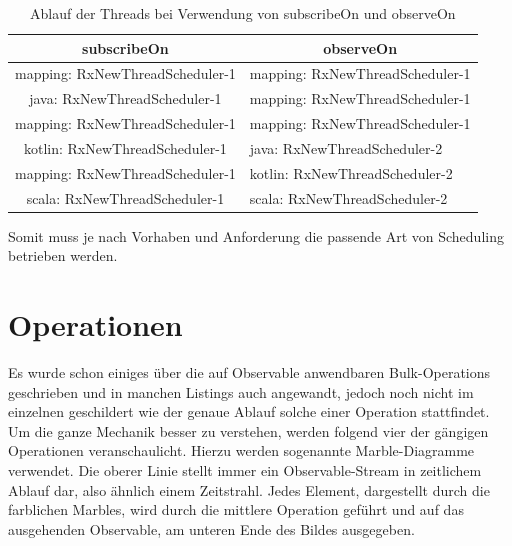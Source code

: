 \begin{table}[]
	\centering
	\begin{tabular}{|c|l|}
		\hline
		\rowcolor[HTML]{C0C0C0} 
		subscribeOn                                           & \multicolumn{1}{c|}{\cellcolor[HTML]{C0C0C0}observeOn} \\ \hline
		mapping: RxNewThreadScheduler-1                       & mapping: RxNewThreadScheduler-1 \\ \hline
		java: RxNewThreadScheduler-1						  & mapping: RxNewThreadScheduler-1 \\ \hline
		mapping: RxNewThreadScheduler-1 					  & mapping: RxNewThreadScheduler-1 \\ \hline
		kotlin: RxNewThreadScheduler-1  					  & java: RxNewThreadScheduler-2    \\ \hline
		mapping: RxNewThreadScheduler-1                       & kotlin: RxNewThreadScheduler-2  \\ \hline
		scala: RxNewThreadScheduler-1                         & scala: RxNewThreadScheduler-2   \\ \hline
	\end{tabular}
	\caption{Ablauf der Threads bei Verwendung von subscribeOn und observeOn}
\label{schedulertable}
\end{table}

Somit muss je nach Vorhaben und Anforderung die passende Art von Scheduling betrieben werden. 
\section{Operationen}
Es wurde schon einiges über die auf Observable anwendbaren Bulk-Operations geschrieben und in manchen Listings auch angewandt, jedoch noch nicht im einzelnen geschildert wie der genaue Ablauf solche einer Operation stattfindet. Um die ganze Mechanik besser zu verstehen, werden folgend vier der gängigen Operationen veranschaulicht. Hierzu werden sogenannte Marble-Diagramme verwendet. Die oberer Linie stellt immer ein Observable-Stream in zeitlichem Ablauf dar, also ähnlich einem Zeitstrahl. Jedes Element, dargestellt durch die farblichen Marbles, wird durch die mittlere Operation geführt und auf das ausgehenden Observable, am unteren Ende des Bildes ausgegeben. 
